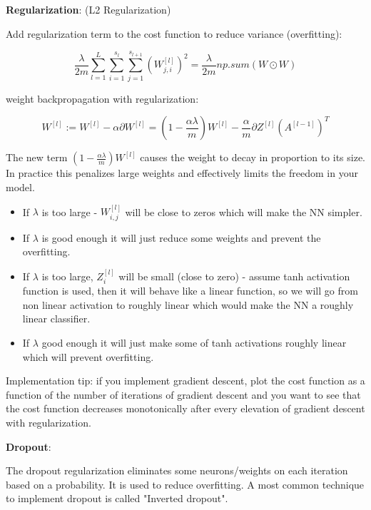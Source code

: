 \documentclass{article}
\begin{document}
\bigskip

\noindent \textbf{Regularization}: (L2 Regularization) 

\noindent Add regularization term to the cost function to reduce variance (overfitting):

\[\frac{\lambda}{2m} \sum_{l = 1}^{L} \sum_{i = 1}^{s_l} \sum_{j = 1}^{s_{l + 1}} (W_{j, i}^{[l]})^{2} = \frac{\lambda}{2m} np.sum(W \odot W)\]

\bigskip

\noindent weight backpropagation with regularization:

\[W^{[l]} := W^{[l]} - \alpha \partial W^{[l]} = (1 - \frac{\alpha \lambda}{m}) W^{[l]} - \frac{\alpha}{m} \partial Z^{[l]} (A^{[l - 1]})^T\]

\noindent The new term \((1 - \frac{\alpha \lambda}{m}) W^{[l]}\) causes the weight to decay in proportion to its size. In practice this penalizes large weights and effectively limits the freedom in your model.


\begin{itemize}
  \item If \(\lambda\) is too large - \(W^{[l]}_{i,j}\) will be close to zeros which will make the NN simpler.
  \item If \(\lambda\) is good enough it will just reduce some weights and prevent the overfitting.
  \item If \(\lambda\) is too large, \(Z^{[l]}_{i}\) will be small (close to zero) - assume tanh activation function is used, then it will behave like a linear function, so we will go from non linear activation to roughly linear which would make the NN a roughly linear classifier.
  \item If \(\lambda\) good enough it will just make some of tanh activations roughly linear which will prevent overfitting.
\end{itemize}

\noindent Implementation tip: if you implement gradient descent, plot the cost function as a function of the number of iterations of gradient descent and you want to see that the cost function decreases monotonically after every elevation of gradient descent with regularization.

\bigskip

\noindent \textbf{Dropout}:

\noindent The dropout regularization eliminates some neurons/weights on each iteration based on a probability. It is used to reduce overfitting. A most common technique to implement dropout is called "Inverted dropout".
\end{document}
